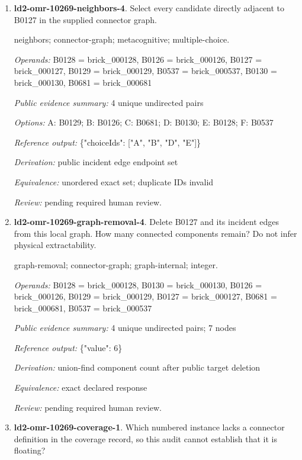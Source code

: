 \begin{enumerate}
\item \textbf{ld2-omr-10269-neighbors-4}. Select every candidate directly adjacent to B0127 in the supplied connector graph.
\par{\small neighbors; connector-graph; metacognitive; multiple-choice.\par\textit{Operands:} B0128 = brick\_000128, B0126 = brick\_000126, B0127 = brick\_000127, B0129 = brick\_000129, B0537 = brick\_000537, B0130 = brick\_000130, B0681 = brick\_000681\par\textit{Public evidence summary:} 4 unique undirected pairs\par\textit{Options:} A: B0129; B: B0126; C: B0681; D: B0130; E: B0128; F: B0537\par\textit{Reference output:} \{"choiceIds": ["A", "B", "D", "E"]\}\par\textit{Derivation:} public incident edge endpoint set\par\textit{Equivalence:} unordered exact set; duplicate IDs invalid\par\textit{Review:} pending required human review.}
\item \textbf{ld2-omr-10269-graph-removal-4}. Delete B0127 and its incident edges from this local graph. How many connected components remain? Do not infer physical extractability.
\par{\small graph-removal; connector-graph; graph-internal; integer.\par\textit{Operands:} B0128 = brick\_000128, B0130 = brick\_000130, B0126 = brick\_000126, B0129 = brick\_000129, B0127 = brick\_000127, B0681 = brick\_000681, B0537 = brick\_000537\par\textit{Public evidence summary:} 4 unique undirected pairs; 7 nodes\par\textit{Reference output:} \{"value": 6\}\par\textit{Derivation:} union-find component count after public target deletion\par\textit{Equivalence:} exact declared response\par\textit{Review:} pending required human review.}
\item \textbf{ld2-omr-10269-coverage-1}. Which numbered instance lacks a connector definition in the coverage record, so this audit cannot establish that it is floating?

\end{enumerate}
